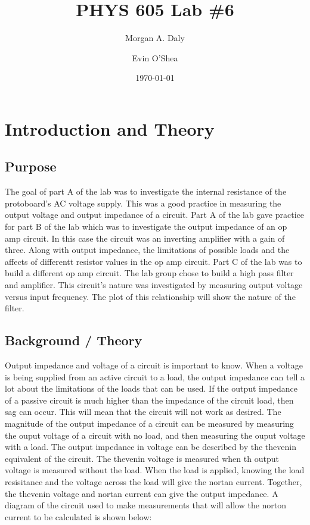 \documentclass[twocolumn, amsmath]{revtex4}
\begin{document}
\title{PHYS 605 Lab \#6} 

\author{Morgan A. Daly}
\author{Evin O'Shea}
\date{\today} 


\maketitle


\section{Introduction and Theory}
\subsection{Purpose}

The goal of part A of the lab was to investigate the internal resistance of the protoboard's AC voltage supply. This was a good practice in measuring the output voltage and output impedance of a circuit. 
Part A of the lab gave practice for part B of the lab which was to investigate the output impedance of an op amp circuit. In this case the circuit was an inverting amplifier with a gain of three. Along with output impedance, the limitations of possible loads and the affects of differentt resistor values in the op amp circuit.
Part C of the lab was to build a different op amp circuit. The lab group chose to build a high pass filter and amplifier. This circuit's nature was investigated by measuring output voltage versus input frequency. The plot of this relationship will show the nature of the filter.

\subsection{Background / Theory}

Output impedance and voltage of a circuit is important to know. When a voltage is being supplied from an active circuit to a load, the output impedance can tell a lot about the limitations of the loads that can be used. If the output impedance of a passive circuit is much higher than the impedance of the circuit load, then sag can occur. This will mean that the circuit will not work as desired. The magnitude of the output impedance of a circuit can be measured by measuring the ouput voltage of a circuit with no load, and then measuring the ouput voltage with a load. The output impedance in voltage can be described by the thevenin equivalent of the circuit. The thevenin voltage is measured when th output voltage is measured without the load. When the load is applied, knowing the load resisitance and the voltage across the load will give the nortan current. Together, the thevenin voltage and nortan current can give the output impedance. A diagram of the circuit used to make measurements that will allow the norton current to be calculated is shown below:
\end{document}
